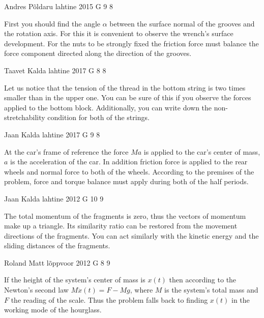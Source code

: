 \documentclass[11pt]{article}
\begin{document}
{Andres Põldaru} %
{lahtine} %
{2015} %
{G 9} %
{8} %
{

\ifEngHint
First you should find the angle $\alpha$ between the surface normal of the grooves and the rotation axis. For this it is convenient to observe the wrench’s surface development. For the nuts to be strongly fixed the friction force must balance the force component directed along the direction of the grooves.
\fi
}

{Taavet Kalda} %
{lahtine} %
{2017} %
{G 8} %
{8} %
{

\ifEngHint
Let us notice that the tension of the thread in the bottom string is two times smaller than in the upper one. You can be sure of this if you observe the forces applied to the bottom block. Additionally, you can write down the non-stretchability condition for both of the strings.
\fi
}

{Jaan Kalda} %
{lahtine} %
{2017} %
{G 9} %
{8} %
{

\ifEngHint
At the car’s frame of reference the force $Ma$ is applied to the car’s center of mass, $a$ is the acceleration of the car. In addition friction force is applied to the rear wheels and normal force to both of the wheels. According to the premises of the problem, force and torque balance must apply during both of the half periods.
\fi
}

{Jaan Kalda} %
{lahtine} %
{2012} %
{G 10} %
{9} %
{

\ifEngHint
The total momentum of the fragments is zero, thus the vectors of momentum make up a triangle. Its similarity ratio can be restored from the movement directions of the fragments. You can act similarly with the kinetic energy and the sliding distances of the fragments.
\fi
}

{Roland Matt} %
{lõppvoor} %
{2012} %
{G 8} %
{9} %
{

\ifEngHint
If the height of the system’s center of mass is $x(t)$ then according to the Newton’s second law $M\ddot{x}(t) = F - Mg$, where $M$ is the system’s total mass and $F$ the reading of the scale. Thus the problem falls back to finding $x(t)$ in the working mode of the hourglass.
\fi
}
\end{document}
